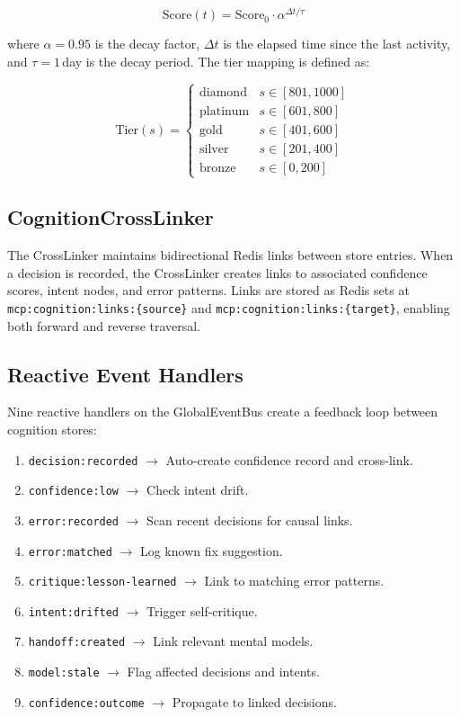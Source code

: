 \documentclass[journal,10pt]{IEEEtran}
\newcommand{\code}[1]{\texttt{#1}}
\begin{document}
\begin{equation}
\text{Score}(t) = \text{Score}_0 \cdot \alpha^{\Delta t / \tau}
\label{eq:decay}
\end{equation}

\noindent where $\alpha = 0.95$ is the decay factor, $\Delta t$ is the elapsed time since the last activity, and $\tau = 1$\,day is the decay period. The tier mapping is defined as:

\begin{equation}
\text{Tier}(s) = \begin{cases}
\text{diamond}  & s \in [801, 1000] \\
\text{platinum} & s \in [601, 800] \\
\text{gold}     & s \in [401, 600] \\
\text{silver}   & s \in [201, 400] \\
\text{bronze}   & s \in [0, 200]
\end{cases}
\label{eq:tier}
\end{equation}

\subsection{CognitionCrossLinker}

The CrossLinker maintains bidirectional Redis links between store entries. When a decision is recorded, the CrossLinker creates links to associated confidence scores, intent nodes, and error patterns. Links are stored as Redis sets at \code{mcp:cognition:links:\{source\}} and \code{mcp:cognition:links:\{target\}}, enabling both forward and reverse traversal.

\subsection{Reactive Event Handlers}

Nine reactive handlers on the GlobalEventBus create a feedback loop between cognition stores:

\begin{enumerate}[nosep]
\item \code{decision:recorded} $\to$ Auto-create confidence record and cross-link.
\item \code{confidence:low} $\to$ Check intent drift.
\item \code{error:recorded} $\to$ Scan recent decisions for causal links.
\item \code{error:matched} $\to$ Log known fix suggestion.
\item \code{critique:lesson-learned} $\to$ Link to matching error patterns.
\item \code{intent:drifted} $\to$ Trigger self-critique.
\item \code{handoff:created} $\to$ Link relevant mental models.
\item \code{model:stale} $\to$ Flag affected decisions and intents.
\item \code{confidence:outcome} $\to$ Propagate to linked decisions.
\end{enumerate}
\end{document}
